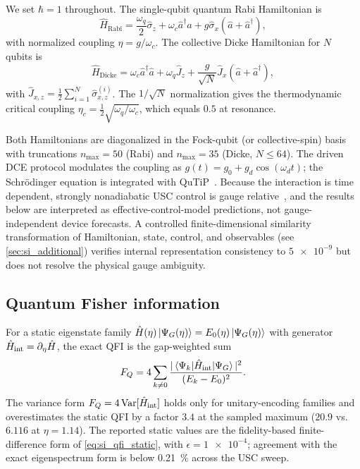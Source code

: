 \documentclass[aps,prxquantum,preprint,superscriptaddress,amsmath,amssymb]{revtex4-2}
\begin{document}
We set $\hbar=1$ throughout. The single-qubit quantum Rabi Hamiltonian is
\begin{equation}
\hat{H}_{\text{Rabi}} = \frac{\omega_q}{2}\hat{\sigma}_z + \omega_c \hat{a}^\dagger \hat{a} + g \hat{\sigma}_x (\hat{a} + \hat{a}^\dagger),
\label{eq:si_rabi}
\end{equation}
with normalized coupling $\eta = g/\omega_c$. The collective Dicke Hamiltonian for $N$ qubits is
\begin{equation}
\hat{H}_{\text{Dicke}} = \omega_c \hat{a}^\dagger \hat{a} + \omega_q \hat{J}_z + \frac{g}{\sqrt{N}} \hat{J}_x (\hat{a} + \hat{a}^\dagger),
\label{eq:si_dicke}
\end{equation}
with $\hat{J}_{x,z} = \frac{1}{2}\sum_{i=1}^N \hat{\sigma}_{x,z}^{(i)}$. The $1/\sqrt{N}$ normalization gives the thermodynamic critical coupling $\eta_c = \frac{1}{2}\sqrt{\omega_q/\omega_c}$, which equals $\num{0.5}$ at resonance.

Both Hamiltonians are diagonalized in the Fock-qubit (or collective-spin) basis with truncations $n_{\max}=\num{50}$ (Rabi) and $n_{\max}=\num{35}$ (Dicke, $N\le\num{64}$). The driven DCE protocol modulates the coupling as $g(t)=g_0+g_d\cos(\omega_d t)$; the Schr\"odinger equation is integrated with QuTiP~\cite{Johansson2012}. Because the interaction is time dependent, strongly nonadiabatic USC control is gauge relative~\cite{Stokes2021}, and the results below are interpreted as effective-control-model predictions, not gauge-independent device forecasts. A controlled finite-dimensional similarity transformation of Hamiltonian, state, control, and observables (see \cref{sec:si_additional}) verifies internal representation consistency to $\num{5e-9}$ but does not resolve the physical gauge ambiguity.

\subsection{Quantum Fisher information}
\label{sec:si_qfi}

For a static eigenstate family $\hat H(\eta)\ket{\Psi_G(\eta)}=E_0(\eta)\ket{\Psi_G(\eta)}$ with generator $\hat H_{\rm int}=\partial_\eta\hat H$, the exact QFI is the gap-weighted sum
\begin{equation}
F_Q = 4\sum_{k\neq 0}\frac{|\braket{\Psi_k|\hat H_{\text{int}}|\Psi_G}|^2}{(E_k-E_0)^2}.
\label{eq:si_qfi_static}
\end{equation}
The variance form $F_Q=4\,\mathrm{Var}[\hat H_{\rm int}]$ holds only for unitary-encoding families and overestimates the static QFI by a factor $\num{3.4}$ at the sampled maximum ($\num{20.9}$ vs.\ $\num{6.116}$ at $\eta=\num{1.14}$). The reported static values are the fidelity-based finite-difference form of \cref{eq:si_qfi_static}, with $\epsilon=\num{1e-4}$; agreement with the exact eigenspectrum form is below \qty{0.21}{\percent} across the USC sweep.
\end{document}
